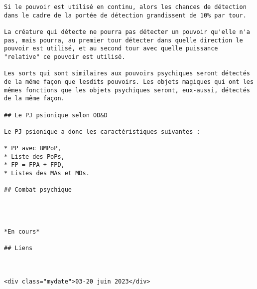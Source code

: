 \documentclass[12pt]{article}
\begin{document}
\begin{verbatim}
Si le pouvoir est utilisé en continu, alors les chances de détection dans le cadre de la portée de détection grandissent de 10% par tour.

La créature qui détecte ne pourra pas détecter un pouvoir qu'elle n'a pas, mais pourra, au premier tour détecter dans quelle direction le pouvoir est utilisé, et au second tour avec quelle puissance "relative" ce pouvoir est utilisé.

Les sorts qui sont similaires aux pouvoirs psychiques seront détectés de la même façon que lesdits pouvoirs. Les objets magiques qui ont les mêmes fonctions que les objets psychiques seront, eux-aussi, détectés de la même façon.

## Le PJ psionique selon OD&D

Le PJ psionique a donc les caractéristiques suivantes :

* PP avec BMPoP,
* Liste des PoPs,
* FP = FPA + FPD,
* Listes des MAs et MDs.

## Combat psychique




*En cours*

## Liens



<div class="mydate">03-20 juin 2023</div>


\end{verbatim}
\end{document}
